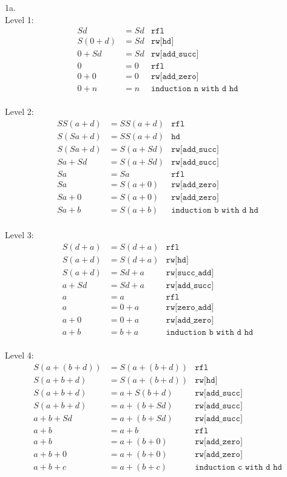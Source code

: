 \documentclass{article}
\theoremstyle{theorem}
\theoremstyle{definition}
\theoremstyle{remark}
\begin{document}
1a.\\
Level 1:
\begin{align*}
  Sd&=Sd & \texttt{rfl} \\
  S(0+d)&=Sd & \texttt{rw[hd]} \\
  0+Sd &= Sd & \texttt{rw[add\_succ]} \\
  0&=0 & \texttt{rfl} \\
  0+0 &= 0 & \texttt{rw[add\_zero]} \\
  0+n &= n & \texttt{induction n with d hd} \\
\end{align*}

Level 2:
\begin{align*}
  SS(a+d)&=SS(a+d) & \texttt{rfl} \\
  S(Sa+d)&=SS(a+d) & \texttt{hd} \\
  S(Sa+d)&=S(a+Sd) & \texttt{rw[add\_succ]} \\
  Sa+Sd&=S(a+Sd) & \texttt{rw[add\_succ]} \\
  Sa&=Sa & \texttt{rfl} \\
  Sa&=S(a+0) & \texttt{rw[add\_zero]} \\
  Sa+0&=S(a+0) & \texttt{rw[add\_zero]} \\
  Sa+b&=S(a+b) & \texttt{induction b with d hd} \\
\end{align*}

Level 3:
\begin{align*}
  S(d+a)&=S(d+a) & \texttt{rfl} \\
  S(a+d)&=S(d+a) & \texttt{rw[hd]} \\
  S(a+d)&=Sd+a & \texttt{rw[succ\_add]} \\
  a+Sd&=Sd+a & \texttt{rw[add\_succ]} \\
  a&=a & \texttt{rfl} \\
  a&=0+a & \texttt{rw[zero\_add]} \\
  a+0&=0+a & \texttt{rw[add\_zero]} \\
  a+b&=b+a & \texttt{induction b with d hd} \\
\end{align*}

Level 4:
\begin{align*}
  S(a+(b+d))&=S(a+(b+d)) & \texttt{rfl} \\
  S(a+b+d)&=S(a+(b+d)) & \texttt{rw[hd]} \\
  S(a+b+d)&=a+S(b+d) & \texttt{rw[add\_succ]} \\
  S(a+b+d)&=a+(b+Sd) & \texttt{rw[add\_succ]} \\
  a+b+Sd&=a+(b+Sd) & \texttt{rw[add\_succ]} \\
  a+b&=a+b & \texttt{rfl} \\
  a+b&=a+(b+0) & \texttt{rw[add\_zero]} \\
  a+b+0&=a+(b+0) & \texttt{rw[add\_zero]} \\
  a+b+c&=a+(b+c) & \texttt{induction c with d hd} \\
\end{align*}
\end{document}
